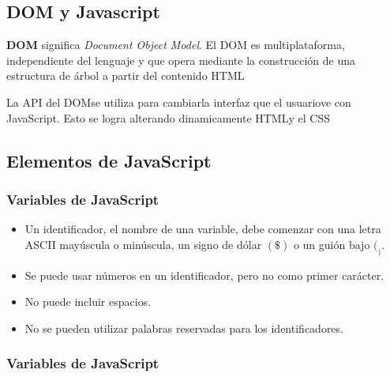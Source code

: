 \subsection{DOM y Javascript}

\textbf{DOM} significa \textit{Document Object Model}. El DOM es multiplataforma, independiente del lenguaje y que opera mediante la construcción de una estructura de árbol a partir del contenido HTML

La API del DOMse utiliza para cambiarla interfaz que el usuariove con JavaScript. Esto se logra alterando dinamicamente HTMLy el CSS


\subsection{Elementos de JavaScript}

\subsubsection*{Variables de JavaScript}

\begin{itemize}
    \item Un identificador, el nombre de una variable, debe comenzar con una letra ASCII mayúscula o minúscula, un signo de dólar  $ (\$) $ o un guión bajo $(_)$.    
    \item Se puede usar números en un identificador, pero no como primer carácter.
    \item No puede incluir espacios.
    \item No se pueden utilizar palabras reservadas para los identificadores.
\end{itemize}

\subsubsection*{Variables de JavaScript}

